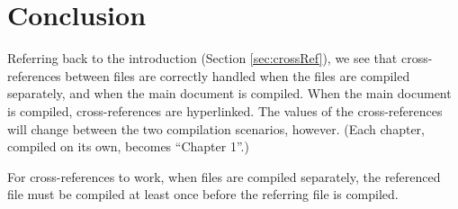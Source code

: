 \documentclass[\main/thesis.tex]{subfiles}
\begin{document}
\chapter{Conclusion}

Referring back to the introduction (Section \ref{sec:crossRef}), we see
that cross-references between files are correctly handled when the files
are compiled separately, and when the main document is compiled.
When the main document is compiled, cross-references are hyperlinked.
The values of the cross-references will change between the two compilation
scenarios, however. (Each chapter, compiled on its own, becomes ``Chapter 1''.)

\begin{note}[Caution:]
For cross-references to work, when files are compiled separately,
the referenced file must be compiled at least once before the
referring file is compiled.
\end{note}
\end{document}
